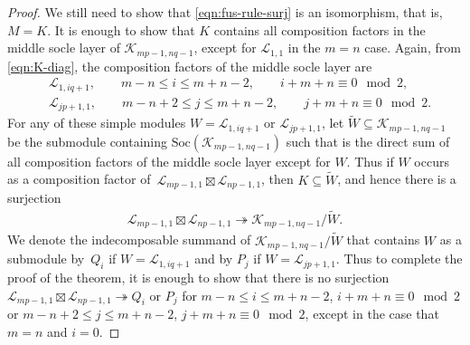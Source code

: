 \documentclass[pdftex]{sigma}
\numberwithin{equation}{section}
\theoremstyle{definition}
\begin{document}
\begin{proof}
We still need to show that \eqref{eqn:fus-rule-surj} is an isomorphism, that is, $M=K$. It is enough to show that $K$ contains all composition factors in the middle socle layer of $\mathcal{K}_{mp-1,nq-1}$, except for $\mathcal{L}_{1,1}$ in the $m=n$ case. Again, from \eqref{eqn:K-diag}, the composition factors of the middle socle layer are
\begin{align*}
&\mathcal{L}_{1,iq+1},\qquad m-n\leq i\leq m+n-2,\qquad i+m+n\equiv 0 \mod 2,\\
 &\mathcal{L}_{jp+1,1}, \qquad m-n+2\leq j\leq m+n-2,\qquad j+m+n\equiv 0 \mod 2.
\end{align*}
For any of these simple modules $W=\mathcal{L}_{1,iq+1}$ or $\mathcal{L}_{jp+1,1}$, let $\widetilde{W}\subseteq\mathcal{K}_{mp-1,nq-1}$ be the submodule containing $\mathrm{Soc}(\mathcal{K}_{mp-1,nq-1})$ such that  is the direct sum of all composition factors of the middle socle layer except for $W$.
Thus if $W$ occurs as a composition factor of~$\mathcal{L}_{mp-1,1}\boxtimes\mathcal{L}_{np-1,1}$, then $K\subseteq\widetilde{W}$, and hence there is a surjection
\begin{gather*}
\mathcal{L}_{mp-1,1}\boxtimes\mathcal{L}_{np-1,1}\twoheadrightarrow\mathcal{K}_{mp-1,nq-1}/\widetilde{W}.
\end{gather*}
We denote the indecomposable summand of $\mathcal{K}_{mp-1,nq-1}/\widetilde{W}$ that contains $W$ as a submodule by~$Q_i$ if $W=\mathcal{L}_{1,iq+1}$ and by $P_j$ if $W=\mathcal{L}_{jp+1,1}$. Thus to complete the proof of the theorem, it is enough to show that there is no surjection $\mathcal{L}_{mp-1,1}\boxtimes\mathcal{L}_{np-1,1}\twoheadrightarrow Q_i$ or $P_j$ for $m-n\leq i\leq m+n-2$, $i+m+n\equiv 0 \mod 2$ or $m-n+2\leq j\leq m+n-2$, $j+m+n\equiv 0 \mod 2$, except in the case that $m=n$ and $i=0$.


\end{proof}
\end{document}
